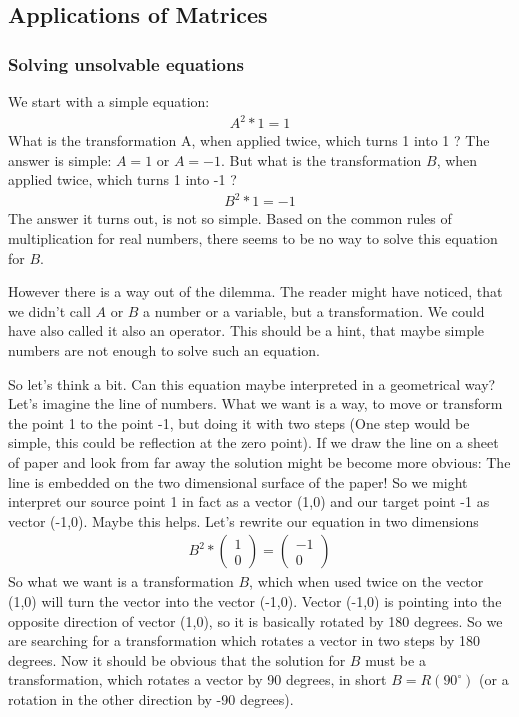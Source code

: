 \subsection{Applications of Matrices}
\subsubsection{Solving unsolvable equations}

We start with a simple equation: 
\begin{align}
A^2 * 1 = 1 
\end{align} 
What is the transformation A, when applied twice, which turns 1 into
1 ? The answer is simple: $A=1$ or $A=-1$. But what is the
transformation $B$, when applied twice, which turns 1 into -1 ? 
\begin{align}
B^2 * 1 = -1 
\end{align} 
The answer it turns out, is not so simple. Based on the common rules
of multiplication for real numbers, there seems to be no way to solve
this equation for $B$.

However there is a way out of the dilemma. The reader might have
noticed, that we didn't call $A$ or $B$ a number or a variable, but
a transformation. We could have also called it also an operator. This
should be a hint, that maybe simple numbers are not enough to solve such
an equation.

So let's think a bit. Can this equation maybe interpreted in a
geometrical way? Let's imagine the line of numbers. What we want is a
way, to move or transform the point 1 to the point -1, but doing it with
two steps (One step would be simple, this could be reflection at the
zero point). If we draw the line on a sheet of paper and look from far
away the solution might be become more obvious: The line is embedded on
the two dimensional surface of the paper! So we might interpret our
source point 1 in fact as a vector (1,0) and our target point -1 as
vector (-1,0). Maybe this helps. Let's rewrite our equation in two
dimensions 
\begin{align}
B^2 * \begin{pmatrix} 1 \\ 0 \end{pmatrix} = \begin{pmatrix} -1 \\ 0 \end{pmatrix} 
\end{align} 
So what we want is a transformation $B$, which when used twice on
the vector (1,0) will turn the vector into the vector (-1,0). Vector
(-1,0) is pointing into the opposite direction of vector (1,0), so it is
basically rotated by 180 degrees. So we are searching for a
transformation which rotates a vector in two steps by 180 degrees. Now
it should be obvious that the solution for $B$ must be a
transformation, which rotates a vector by 90 degrees, in short
$B = R(90^{\circ})$ (or a rotation in the other direction by -90
degrees).

